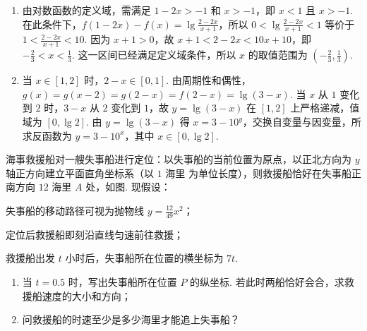 \begin{solution}
\begin{enumerate}
\item 由对数函数的定义域，需满足 \(1-2x>-1\) 和 \(x>-1\)，即 \(x<1\) 且 \(x>-1\). 在此条件下，\(f(1-2x)-f(x)=\lg\frac{2-2x}{x+1}\)，所以 \(0<\lg\frac{2-2x}{x+1}<1\) 等价于 \(1<\frac{2-2x}{x+1}<10\). 因为 \(x+1>0\)，故 \(x+1<2-2x<10x+10\)，即 \(-\frac23<x<\frac13\). 这一区间已经满足定义域条件，所以 \(x\) 的取值范围为 \(\left(-\frac23,\frac13\right)\).
\item 当 \(x\in[1,2]\) 时，\(2-x\in[0,1]\). 由周期性和偶性，\(g(x)=g(x-2)=g(2-x)=f(2-x)=\lg(3-x)\). 当 \(x\) 从 \(1\) 变化到 \(2\) 时，\(3-x\) 从 \(2\) 变化到 \(1\)，故 \(y=\lg(3-x)\) 在 \([1,2]\) 上严格递减，值域为 \([0,\lg2]\). 由 \(y=\lg(3-x)\) 得 \(x=3-10^y\)，交换自变量与因变量，所求反函数为 \(y=3-10^x\)，其中 \(x\in[0,\lg2]\).
\end{enumerate}
\end{solution}

\begin{problem}
海事救援船对一艘失事船进行定位：以失事船的当前位置为原点，以正北方向为 \(y\) 轴正方向建立平面直角坐标系（以 \(1\text{ 海里}\) 为单位长度），则救援船恰好在失事船正南方向 \(12\text{ 海里}\) \(A\) 处，如图. 现假设：
\begin{circlelist}
\item 失事船的移动路径可视为抛物线 \(y = \frac{12}{49} x^{2}\)；
\item 定位后救援船即刻沿直线匀速前往救援；
\item 救援船出发 \(t\) 小时后，失事船所在位置的横坐标为 \(7t\).
\end{circlelist}
\begin{enumerate}
\item 当 \(t = 0.5\) 时，写出失事船所在位置 \(P\) 的纵坐标. 若此时两船恰好会合，求救援船速度的大小和方向；
\item 问救援船的时速至少是多少海里才能追上失事船？
\end{enumerate}

\end{problem}


